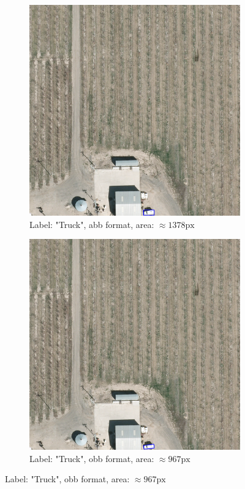 \begin{figure}[h]
    \begin{subfigure}[b]{0.45\textwidth}
        \centering
        \includegraphics[trim={550pt 0pt 410pt 990pt},clip,width=\textwidth]{images/015Results/01abb_vs_obb/abb_truck.png}
        \caption{Label: "Truck", abb format, area: $\approx 1378 \text{px}$}
        \label{fig:abb_truck}
    \end{subfigure}
    \hfill
    \begin{subfigure}[b]{0.45\textwidth}
        \centering
        \includegraphics[trim={550pt 0pt 410pt 990pt},clip,width=\textwidth]{images/015Results/01abb_vs_obb/obb_truck.png}
        \caption{Label: "Truck", obb format, area: $\approx 967 \text{px}$}
        \label{fig:obb_truck}
    \end{subfigure}
    

\end{figure}
